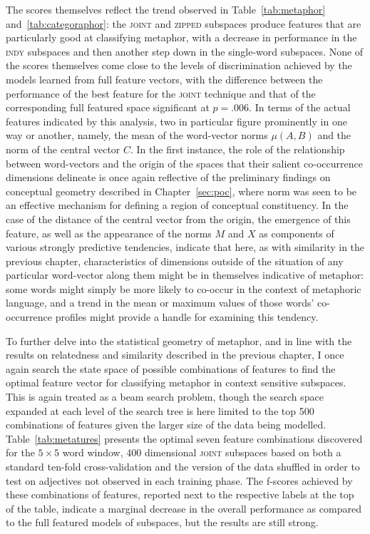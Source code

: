 The scores themselves reflect the trend observed in Table~\ref{tab:metaphor} and~\ref{tab:categoraphor}: the \textsc{joint} and \textsc{zipped} subspaces produce features that are particularly good at classifying metaphor, with a decrease in performance in the \textsc{indy} subspaces and then another step down in the single-word subspaces.  None of the scores themselves come close to the levels of discrimination achieved by the models learned from full feature vectors, with the difference between the performance of the best feature for the \textsc{joint} technique and that of the corresponding full featured space significant at $p = .006$.  In terms of the actual features indicated by this analysis, two in particular figure prominently in one way or another, namely, the mean of the word-vector norms $\mu(A,B)$ and the norm of the central vector $C$.  In the first instance, the role of the relationship between word-vectors and the origin of the spaces that their salient co-occurrence dimensions delineate is once again reflective of the preliminary findings on conceptual geometry described in Chapter~\ref{sec:poc}, where norm was seen to be an effective mechanism for defining a region of conceptual constituency.  In the case of the distance of the central vector from the origin, the emergence of this feature, as well as the appearance of the norms $M$ and $X$ as components of various strongly predictive tendencies, indicate that here, as with similarity in the previous chapter, characteristics of dimensions outside of the situation of any particular word-vector along them might be in themselves indicative of metaphor: some words might simply be more likely to co-occur in the context of metaphoric language, and a trend in the mean or maximum values of those words' co-occurrence profiles might provide a handle for examining this tendency.

To further delve into the statistical geometry of metaphor, and in line with the results on relatedness and similarity described in the previous chapter, I once again search the state space of possible combinations of features to find the optimal feature vector for classifying metaphor in context sensitive subspaces.  This is again treated as a beam search problem, though the search space expanded at each level of the search tree is here limited to the top 500 combinations of features given the larger size of the data being modelled.  Table~\ref{tab:metatures} presents the optimal seven feature combinations discovered for the $5 \times 5$ word window, 400 dimensional \textsc{joint} subspaces based on both a standard ten-fold cross-validation and the version of the data shuffled in order to test on adjectives not observed in each training phase.  The f-scores achieved by these combinations of features, reported next to the respective labels at the top of the table, indicate a marginal decrease in the overall performance as compared to the full featured models of subspaces, but the results are still strong.

